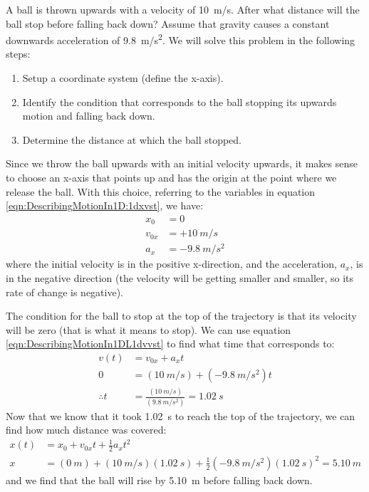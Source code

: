 \begin{example}{A ball is thrown upwards with a velocity of \SI{10}{m/s}. After what distance will the ball stop before falling back down? Assume that gravity causes a constant downwards acceleration of \SI{9.8}{m/s^2}.}
\label{ex:DescribingMotionIn1D:ballupandown}
We will solve this problem in the following steps:
\begin{enumerate}[topsep=-10pt]
\item Setup a coordinate system (define the x-axis).
\item Identify the condition that corresponds to the ball stopping its upwards motion and falling back down.
\item Determine the distance at which the ball stopped.
\end{enumerate}
Since we throw the ball upwards with an initial velocity upwards, it makes sense to choose an x-axis that points up and has the origin at the point where we release the ball. With this choice, referring to the variables in equation \ref{eqn:DescribingMotionIn1D:1dxvst}, we have:
\begin{align*}
x_0&=0\\
v_{0x}&=+\SI{10}{m/s}\\
a_x&=\SI{-9.8}{m/s^2}
\end{align*}
where the initial velocity is in the positive x-direction, and the acceleration, $a_x$, is in the negative direction (the velocity will be getting smaller and smaller, so its rate of change is negative).

The condition for the ball to stop at the top of the trajectory is that its velocity will be zero (that is what it means to stop). We can use equation \ref{eqn:DescribingMotionIn1DL1dvvst} to find what time that corresponds to:
\begin{align*}
v(t) &= v_{0x}+a_xt\\
0 &= (\SI{10}{m/s}) + (\SI{-9.8}{m/s^2})t\\
\therefore t&=\frac{(\SI{10}{m/s})}{(\SI{9.8}{m/s^2})}=\SI{1.02}{s}
\end{align*}
Now that we know that it took \SI{1.02}{s} to reach the top of the trajectory, we can find how much distance was covered:
\begin{align*}
x(t) &= x_0+v_{0x}t+ \frac{1}{2}a_xt^2\\
x &= (\SI{0}{m})+(\SI{10}{m/s})(\SI{1.02}{s})+\frac{1}{2}(\SI{-9.8}{m/s^2})(\SI{1.02}{s})^2 = \SI{5.10}{m}
\end{align*}
and we find that the ball will rise by \SI{5.10}{m} before falling back down. 
\end{example}

